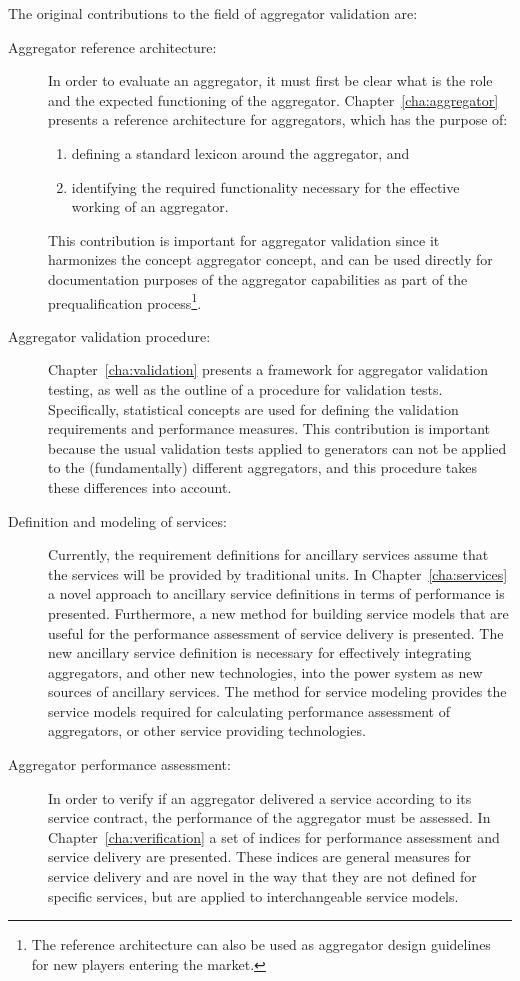 The original contributions to the field of aggregator validation are:
\begin{description}
	\item[Aggregator reference architecture:] In order to evaluate an aggregator, it must first be clear what is the role and the expected functioning of the aggregator. Chapter~\ref{cha:aggregator} presents a reference architecture for aggregators, which has the purpose of:
		\begin{enumerate}
			\item defining a standard lexicon around the aggregator, and
			\item identifying the required functionality necessary for the effective working of an aggregator.
		\end{enumerate}
		This contribution is important for aggregator validation since it harmonizes the concept aggregator concept, and can be used directly for documentation purposes of the aggregator capabilities as part of the prequalification process\footnote{ The reference architecture can also be used as aggregator design guidelines for new players entering the market.}. 
	\item[Aggregator validation procedure:] Chapter~\ref{cha:validation} presents a framework for aggregator validation testing, as well as the outline of a procedure for validation tests. Specifically, statistical concepts are used for defining the validation requirements and performance measures. This contribution is important because the usual validation tests applied to generators can not be applied to the (fundamentally) different aggregators, and this procedure takes these differences into account.
	\item[Definition and modeling of services:] Currently, the requirement definitions for ancillary services assume that the services will be provided by traditional units. In Chapter~\ref{cha:services} a novel approach to ancillary service definitions in terms of performance is presented. Furthermore, a new method for building service models that are useful for the performance assessment of service delivery is presented. The new ancillary service definition is necessary for effectively integrating aggregators, and other new technologies, into the power system as new sources of ancillary services. The method for service modeling provides the service models required for calculating performance assessment of aggregators, or other service providing technologies.
	\item[Aggregator performance assessment:] In order to verify if an aggregator delivered a service according to its service contract, the performance of the aggregator must be assessed. In Chapter~\ref{cha:verification} a set of indices for performance assessment and service delivery are presented. These indices are general measures for service delivery and are novel in the way that they are not defined for specific services, but are applied to interchangeable service models.
\end{description}

